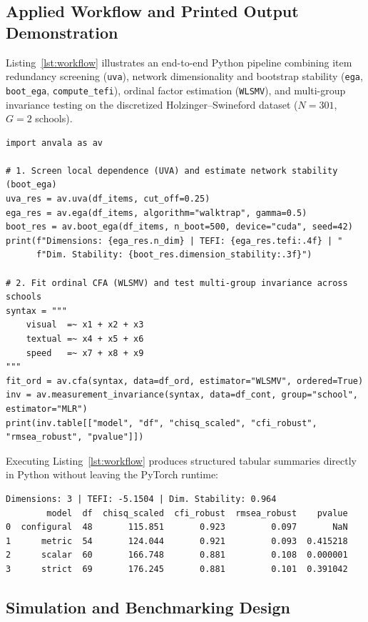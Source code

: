 ﻿\documentclass[12pt,letterpaper]{article}
\begin{document}
\subsection{Applied Workflow and Printed Output Demonstration}

Listing~\ref{lst:workflow} illustrates an end-to-end Python pipeline combining item redundancy screening (\texttt{uva}), network dimensionality and bootstrap stability (\texttt{ega}, \texttt{boot\_ega}, \texttt{compute\_tefi}), ordinal factor estimation (\texttt{WLSMV}), and multi-group invariance testing on the discretized Holzinger--Swineford dataset ($N = 301$, $G = 2$ schools).

\begin{lstlisting}[caption={End-to-End Computational Psychometrics Workflow and Printed Output in \protect\texttt{anvala}}, label={lst:workflow}]
import anvala as av

# 1. Screen local dependence (UVA) and estimate network stability (boot_ega)
uva_res = av.uva(df_items, cut_off=0.25)
ega_res = av.ega(df_items, algorithm="walktrap", gamma=0.5)
boot_res = av.boot_ega(df_items, n_boot=500, device="cuda", seed=42)
print(f"Dimensions: {ega_res.n_dim} | TEFI: {ega_res.tefi:.4f} | "
      f"Dim. Stability: {boot_res.dimension_stability:.3f}")

# 2. Fit ordinal CFA (WLSMV) and test multi-group invariance across schools
syntax = """
    visual  =~ x1 + x2 + x3
    textual =~ x4 + x5 + x6
    speed   =~ x7 + x8 + x9
"""
fit_ord = av.cfa(syntax, data=df_ord, estimator="WLSMV", ordered=True)
inv = av.measurement_invariance(syntax, data=df_cont, group="school", estimator="MLR")
print(inv.table[["model", "df", "chisq_scaled", "cfi_robust", "rmsea_robust", "pvalue"]])
\end{lstlisting}

\noindent Executing Listing~\ref{lst:workflow} produces structured tabular summaries directly in Python without leaving the PyTorch runtime:
\begin{verbatim}
Dimensions: 3 | TEFI: -5.1504 | Dim. Stability: 0.964
        model  df  chisq_scaled  cfi_robust  rmsea_robust    pvalue
0  configural  48       115.851       0.923         0.097       NaN
1      metric  54       124.044       0.921         0.093  0.415218
2      scalar  60       166.748       0.881         0.108  0.000001
3      strict  69       176.245       0.881         0.101  0.391042
\end{verbatim}

\subsection{Simulation and Benchmarking Design}
\end{document}
